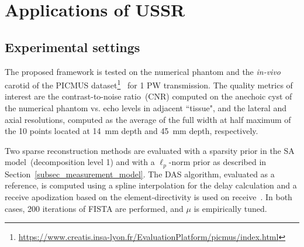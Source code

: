 \documentclass[conference]{IEEEtran}
\begin{document}
\section{Applications of USSR}
\label{sec_ussr_applications}
\subsection{Experimental settings}
\label{subsec_exp_settings}
The proposed framework is tested on the numerical phantom and the \textit{in-vivo} carotid of the PICMUS dataset\footnote{\url{https://www.creatis.insa-lyon.fr/EvaluationPlatform/picmus/index.html}}~\cite{Liebgott_IUS_2016} for \num{1} PW transmission. The quality metrics of interest are the contrast-to-noise ratio~(CNR) computed on the anechoic cyst of the numerical phantom vs. echo levels in adjacent ``tissue", and the lateral and axial resolutions, computed as the average of the full width at half maximum of the \num{10} points located at \SI{14}{\milli\metre} depth and \SI{45}{\milli\metre} depth, respectively.

Two sparse reconstruction methods are evaluated with a sparsity prior in the SA model~(decomposition level \num{1}) and with a $\ell_p$-norm prior as described in Section~\ref{subsec_measurement_model}. The DAS algorithm, evaluated as a reference, is computed using a spline interpolation for the delay calculation and a receive apodization based on the element-directivity is used on receive~\cite{Selfridge1980}. In both cases, \num{200} iterations of FISTA are performed, and $\mu$ is empirically tuned.
\end{document}
